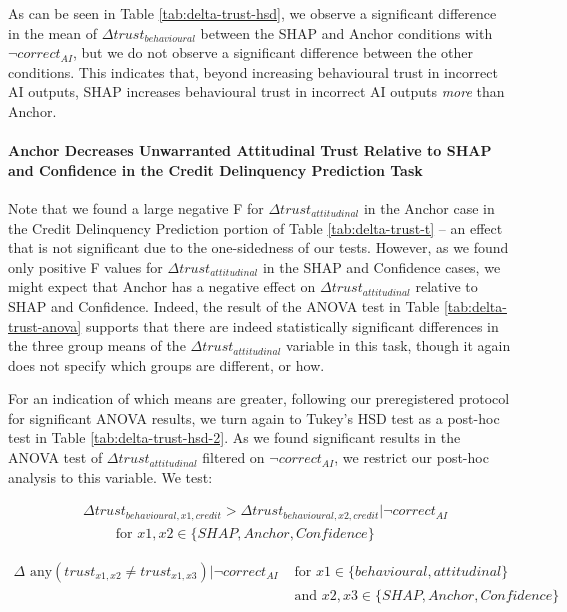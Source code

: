 As can be seen in Table \ref{tab:delta-trust-hsd}, we observe a significant difference in the mean of $\Delta trust_{behavioural}$ between the SHAP and Anchor conditions with $\neg correct_{AI}$, but we do not observe a significant difference between the other conditions. This indicates that, beyond increasing behavioural trust in incorrect AI outputs, SHAP increases behavioural trust in incorrect AI outputs \emph{more} than Anchor.

\paragraph{Anchor Decreases Unwarranted Attitudinal Trust Relative to SHAP and Confidence in the Credit Delinquency Prediction Task}
Note that we found a large negative F for $\Delta trust_{attitudinal}$ in the Anchor case in the Credit Delinquency Prediction portion of Table \ref{tab:delta-trust-t} – an effect that is not significant due to the one-sidedness of our tests. However, as we found only positive F values for $\Delta trust_{attitudinal}$ in the SHAP and Confidence cases, we might expect that Anchor has a negative effect on $\Delta trust_{attitudinal}$ relative to SHAP and Confidence. Indeed, the result of the ANOVA test in Table \ref{tab:delta-trust-anova} supports that there are indeed statistically significant differences in the three group means of the $\Delta trust_{attitudinal}$ variable in this task, though it again does not specify which groups are different, or how.

For an indication of which means are greater, following our preregistered protocol for significant ANOVA results, we turn again to Tukey's HSD test as a post-hoc test in Table \ref{tab:delta-trust-hsd-2}. As we found significant results in the ANOVA test of $\Delta trust_{attitudinal}$ filtered on $\neg correct_{AI}$, we restrict our post-hoc analysis to this variable. We test:

\begin{equation}
    \begin{split}
        & \Delta trust_{behavioural,x1,credit} > \Delta trust_{behavioural,x2,credit} | \neg correct_{AI} \\
        & \qquad \text{ for } x1,x2 \in \{SHAP, Anchor, Confidence\}
    \end{split}
\end{equation}

\begin{equation}
    \begin{split}
        \Delta \text{ any}(trust_{x1,x2} \neq trust_{x1,x3}) | \neg correct_{AI} & \text{ for } x1 \in \{behavioural, attitudinal\} \\
        & \text{ and } x2,x3 \in \{SHAP, Anchor, Confidence\}
    \end{split}
\end{equation}

